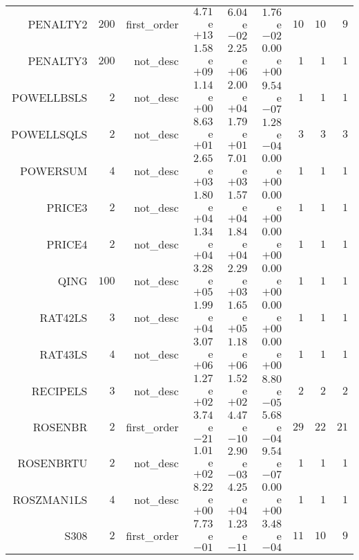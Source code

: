 \begin{longtable}{rrrrrrrrr}
PENALTY2 & \(   200\) & first\_order & \( 4.71\)e\(+13\) & \( 6.04\)e\(-02\) & \( 1.76\)e\(-02\) & \(    10\) & \(    10\) & \(     9\) \\
PENALTY3 & \(   200\) & not\_desc & \( 1.58\)e\(+09\) & \( 2.25\)e\(+06\) & \( 0.00\)e\(+00\) & \(     1\) & \(     1\) & \(     1\) \\
POWELLBSLS & \(     2\) & not\_desc & \( 1.14\)e\(+00\) & \( 2.00\)e\(+04\) & \( 9.54\)e\(-07\) & \(     1\) & \(     1\) & \(     1\) \\
POWELLSQLS & \(     2\) & not\_desc & \( 8.63\)e\(+01\) & \( 1.79\)e\(+01\) & \( 1.28\)e\(-04\) & \(     3\) & \(     3\) & \(     3\) \\
POWERSUM & \(     4\) & not\_desc & \( 2.65\)e\(+03\) & \( 7.01\)e\(+03\) & \( 0.00\)e\(+00\) & \(     1\) & \(     1\) & \(     1\) \\
PRICE3 & \(     2\) & not\_desc & \( 1.80\)e\(+04\) & \( 1.57\)e\(+04\) & \( 0.00\)e\(+00\) & \(     1\) & \(     1\) & \(     1\) \\
PRICE4 & \(     2\) & not\_desc & \( 1.34\)e\(+04\) & \( 1.84\)e\(+04\) & \( 0.00\)e\(+00\) & \(     1\) & \(     1\) & \(     1\) \\
QING & \(   100\) & not\_desc & \( 3.28\)e\(+05\) & \( 2.29\)e\(+03\) & \( 0.00\)e\(+00\) & \(     1\) & \(     1\) & \(     1\) \\
RAT42LS & \(     3\) & not\_desc & \( 1.99\)e\(+04\) & \( 1.65\)e\(+05\) & \( 0.00\)e\(+00\) & \(     1\) & \(     1\) & \(     1\) \\
RAT43LS & \(     4\) & not\_desc & \( 3.07\)e\(+06\) & \( 1.18\)e\(+06\) & \( 0.00\)e\(+00\) & \(     1\) & \(     1\) & \(     1\) \\
RECIPELS & \(     3\) & not\_desc & \( 1.27\)e\(+02\) & \( 1.52\)e\(+02\) & \( 8.80\)e\(-05\) & \(     2\) & \(     2\) & \(     2\) \\
ROSENBR & \(     2\) & first\_order & \( 3.74\)e\(-21\) & \( 4.47\)e\(-10\) & \( 5.68\)e\(-04\) & \(    29\) & \(    22\) & \(    21\) \\
ROSENBRTU & \(     2\) & not\_desc & \( 1.01\)e\(+02\) & \( 2.90\)e\(-03\) & \( 9.54\)e\(-07\) & \(     1\) & \(     1\) & \(     1\) \\
ROSZMAN1LS & \(     4\) & not\_desc & \( 8.22\)e\(+00\) & \( 4.25\)e\(+04\) & \( 0.00\)e\(+00\) & \(     1\) & \(     1\) & \(     1\) \\
S308 & \(     2\) & first\_order & \( 7.73\)e\(-01\) & \( 1.23\)e\(-11\) & \( 3.48\)e\(-04\) & \(    11\) & \(    10\) & \(     9\) \\

\end{longtable}
